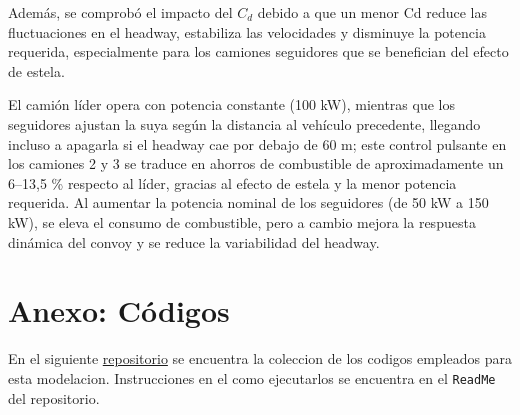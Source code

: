 \documentclass[11pt,stdletter,orderfromtodate,sigleft,twoside]{report}
\begin{document}
Además, se comprobó el impacto del \(C_d\) debido a que un menor Cd reduce las fluctuaciones en el headway, estabiliza las velocidades y disminuye la potencia requerida, especialmente para los camiones seguidores que se benefician del efecto de estela.

El camión líder opera con potencia constante (100 kW), mientras que los seguidores ajustan la suya según la distancia al vehículo precedente, llegando incluso a apagarla si el headway cae por debajo de 60 m; este control pulsante en los camiones 2 y 3 se traduce en ahorros de combustible de aproximadamente un 6–13,5 \% respecto al líder, gracias al efecto de estela y la menor potencia requerida. Al aumentar la potencia nominal de los seguidores (de 50 kW a 150 kW), se eleva el consumo de combustible, pero a cambio mejora la respuesta dinámica del convoy y se reduce la variabilidad del headway.



\section{Anexo: Códigos}
En el siguiente \href{https://github.com/Ichibin/Taller01MathModeling}{repositorio} se encuentra la coleccion de los codigos empleados para esta modelacion. Instrucciones en el como ejecutarlos se encuentra en el \texttt{ReadMe} del repositorio.


\printbibliography[heading=secbib]
\end{document}
